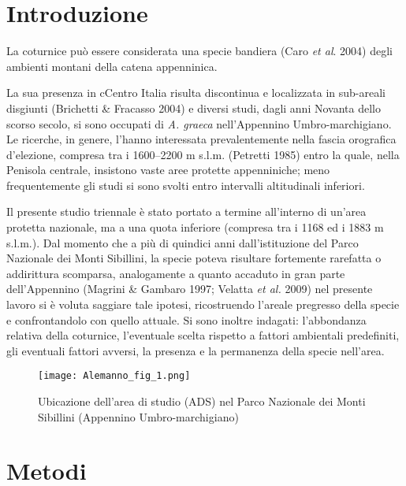 \section*{Introduzione}

La coturnice pu\`o essere considerata una specie bandiera (Caro
\textit{et al}. 2004) degli ambienti montani della catena appenninica.

La sua presenza in cCentro Italia risulta discontinua e localizzata in
sub-areali disgiunti (Brichetti \& Fracasso 2004) e diversi studi,
dagli anni Novanta dello scorso secolo, si sono occupati di \textit{A.
graeca }nell{\textquoteright}Appennino Umbro-marchigiano. Le ricerche,
in genere, l{\textquoteright}hanno interessata prevalentemente nella
fascia orografica d{\textquoteright}elezione, compresa tra i 1600--2200
m s.l.m. (Petretti 1985) entro la quale, nella Penisola centrale,
insistono vaste aree protette appenniniche; meno frequentemente gli
studi si sono svolti entro intervalli altitudinali inferiori.

Il presente studio triennale \`e stato portato a termine
all{\textquoteright}interno di un{\textquoteright}area protetta
nazionale, ma a una quota inferiore (compresa tra i 1168 ed i 1883 m
s.l.m.). Dal momento che a pi\`u di quindici anni
dall{\textquoteright}istituzione del Parco Nazionale dei Monti
Sibillini, la specie poteva risultare fortemente rarefatta o
addirittura scomparsa, analogamente a quanto accaduto in gran parte
dell{\textquoteright}Appennino (Magrini \& Gambaro 1997; Velatta
\textit{et al.} 2009) nel presente lavoro si \`e voluta saggiare tale
ipotesi, ricostruendo l{\textquoteright}areale pregresso della specie e
confrontandolo con quello attuale. Si sono inoltre indagati:
l{\textquoteright}abbondanza relativa della coturnice,
l{\textquoteright}eventuale scelta rispetto a fattori ambientali
predefiniti, gli eventuali fattori avversi, la presenza e la permanenza
della specie nell{\textquoteright}area.

\begin{figure}[!h]
\centering
\texttt{[image: Alemanno\_fig\_1.png]}

\caption{Ubicazione dell{\textquoteright}area di studio (ADS) nel Parco Nazionale dei Monti Sibillini (Appennino Umbro-marchigiano)}
\label{Alemanno_fig_1}
\end{figure}

\section*{Metodi}

